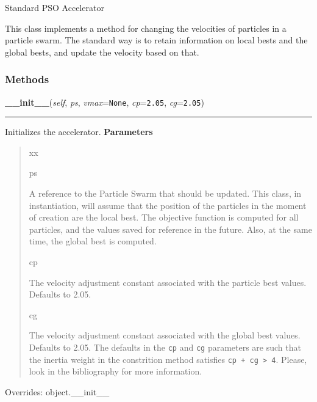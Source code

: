 Standard PSO Accelerator

This class implements a method for changing the velocities of particles in
a particle swarm. The standard way is to retain information on local bests
and the global bests, and update the velocity based on that.


  \subsubsection{Methods}

    \vspace{0.5ex}

\hspace{.8\funcindent}\begin{boxedminipage}{\funcwidth}

    \raggedright \textbf{\_\_init\_\_}(\textit{self}, \textit{ps}, \textit{vmax}={\tt None}, \textit{cp}={\tt 2.05}, \textit{cg}={\tt 2.05})

    \vspace{-1.5ex}

    \rule{\textwidth}{0.5\fboxrule}
\setlength{\parskip}{2ex}

Initializes the accelerator.
\setlength{\parskip}{1ex}
      \textbf{Parameters}
      \vspace{-1ex}

      \begin{quote}
        \begin{Ventry}{xx}

          \item[ps]


A reference to the Particle Swarm that should be updated. This
class, in instantiation, will assume that the position of the
particles in the moment of creation are the local best. The
objective function is computed for all particles, and the values
saved for reference in the future. Also, at the same time, the
global best is computed.
          \item[cp]


The velocity adjustment constant associated with the particle best
values. Defaults to 2.05.
          \item[cg]


The velocity adjustment constant associated with the global best
values. Defaults to 2.05. The defaults in the \texttt{cp} and \texttt{cg}
parameters are such that the inertia weight in the constrition
method satisfies \texttt{cp + cg > 4}. Please, look in the bibliography
for more information.
        \end{Ventry}

      \end{quote}

      Overrides: object.\_\_init\_\_

    \end{boxedminipage}

